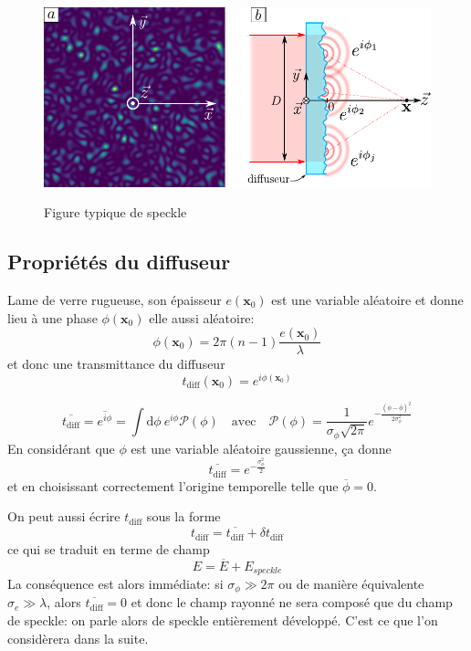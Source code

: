 \begin{figure}
\centering
\includegraphics[scale=1]{Fig/Speckle/speckle_pattern.pdf}
\label{fig:speckle_pattern}
\caption{Figure typique de speckle}
\end{figure}

\subsection{Propriétés du diffuseur}

Lame de verre rugueuse, son épaisseur $e(\mathbf{x}_0)$ est une variable aléatoire et donne lieu à une phase $\phi(\mathbf{x}_0)$ elle aussi aléatoire:
\begin{equation}
\phi(\mathbf{x}_0)=2\pi (n-1) \frac{e(\mathbf{x}_0)}{\lambda}
\end{equation}
et donc une transmittance du diffuseur 
\begin{equation}
t_{\mathrm{diff}}(\mathbf{x}_0)=e^{i\phi(\mathbf{x}_0)}
\end{equation}

\begin{equation}
\overline{t_{\mathrm{diff}}} = \overline{e^{i\phi}} = \int{\mathrm{d}\phi \: e^{i\phi} \mathcal{P}(\phi)} \quad\text{avec}\quad \mathcal{P}(\phi)=\frac{1}{\sigma_{\phi} \sqrt{2\pi}} e^{-\frac{(\phi-\overline{\phi})^2}{2\sigma_{\phi}^2}}
\end{equation}
En considérant que $\phi$ est une variable aléatoire gaussienne, ça donne
\begin{equation}
\overline{t_{\mathrm{diff}}}=e^{-\frac{\sigma_{\phi}^2}{2}}
\end{equation}
et en choisissant correctement l'origine temporelle telle que $\overline{\phi}=0$.

On peut aussi écrire $t_{\mathrm{diff}}$ sous la forme
\begin{equation}
t_{\mathrm{diff}}=\overline{t_{\mathrm{diff}}}+\delta t_{\mathrm{diff}}
\end{equation}
ce qui se traduit en terme de champ
\begin{equation}
E=\overline{E}+E_{speckle}
\end{equation}
La conséquence est alors immédiate: si $\sigma_{\phi} \gg 2\pi$ ou de manière équivalente $\sigma_e \gg \lambda$, alors $\overline{t_{\mathrm{diff}}} =0$ et donc le champ rayonné ne sera composé que du champ de speckle: on parle alors de speckle entièrement développé. C'est ce que l'on considèrera dans la suite.

